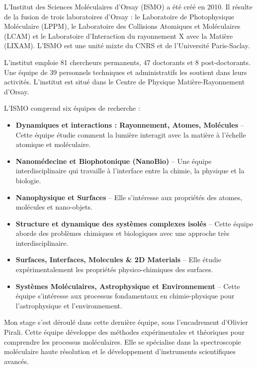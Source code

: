 L'Institut des Sciences Moléculaires d'Orsay (ISMO) a été créé en 2010. Il résulte de la fusion de trois laboratoires d'Orsay : le Laboratoire de Photophysique Moléculaire (LPPM), le Laboratoire des Collisions Atomiques et Moléculaires (LCAM) et le Laboratoire d'Interaction du rayonnement X avec la Matière (LIXAM). L'ISMO est une unité mixte du CNRS et de l'Université Paris-Saclay.

L'institut emploie 81 chercheurs permanents, 47 doctorants et 8 post-doctorants. Une équipe de 39 personnels techniques et administratifs les soutient dans leurs activités. L'institut est situé dans le Centre de Physique Matière-Rayonnement d'Orsay.

L'ISMO comprend six équipes de recherche :

\begin{itemize}
    \item \textbf{Dynamiques et interactions : Rayonnement, Atomes, Molécules} -- Cette équipe étudie comment la lumière interagit avec la matière à l'échelle atomique et moléculaire.
    
    \item \textbf{Nanomédecine et Biophotonique (NanoBio)} -- Une équipe interdisciplinaire qui travaille à l'interface entre la chimie, la physique et la biologie.
    
    \item \textbf{Nanophysique et Surfaces} -- Elle s'intéresse aux propriétés des atomes, molécules et nano-objets.
    
    \item \textbf{Structure et dynamique des systèmes complexes isolés} -- Cette équipe aborde des problèmes chimiques et biologiques avec une approche très interdisciplinaire.
    
    \item \textbf{Surfaces, Interfaces, Molecules \& 2D Materials} -- Elle étudie expérimentalement les propriétés physico-chimiques des surfaces.
    
    \item \textbf{Systèmes Moléculaires, Astrophysique et Environnement} -- Cette équipe s'intéresse aux processus fondamentaux en chimie-physique pour l'astrophysique et l'environnement.
\end{itemize}

Mon stage s'est déroulé dans cette dernière équipe, sous l'encadrement d'Olivier Pirali. Cette équipe développe des méthodes expérimentales et théoriques pour comprendre les processus moléculaires. Elle se spécialise dans la spectroscopie moléculaire haute résolution et le développement d'instruments scientifiques avancés.


